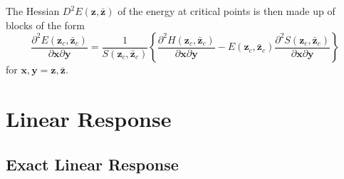 \documentclass[aps,preprint]{revtex4}%
\begin{document}
The Hessian $D^{2}E\left(  \mathbf{z},\mathbf{\bar{z}}\right)  $ of the energy
at critical points is then made up of blocks of the form
\begin{equation}
\frac{\partial^{2}E\left(  \mathbf{z}_{c},\mathbf{\bar{z}}_{c}\right)
}{\partial\mathbf{x}\partial\mathbf{y}}=\frac{1}{S\left(  \mathbf{z}%
_{c},\mathbf{\bar{z}}_{c}\right)  }\left\{  \frac{\partial^{2}H\left(
\mathbf{z}_{c},\mathbf{\bar{z}}_{c}\right)  }{\partial\mathbf{x}%
\partial\mathbf{y}}-E\left(  \mathbf{z}_{c},\mathbf{\bar{z}}_{c}\right)
\frac{\partial^{2}S\left(  \mathbf{z}_{c},\mathbf{\bar{z}}_{c}\right)
}{\partial\mathbf{x}\partial\mathbf{y}}\right\}
\end{equation}
for $\mathbf{x},\mathbf{y=z},\mathbf{\bar{z}}$.

\section{Linear Response\label{linres}}

\subsection{Exact Linear Response\label{exlinres}}
\end{document}
